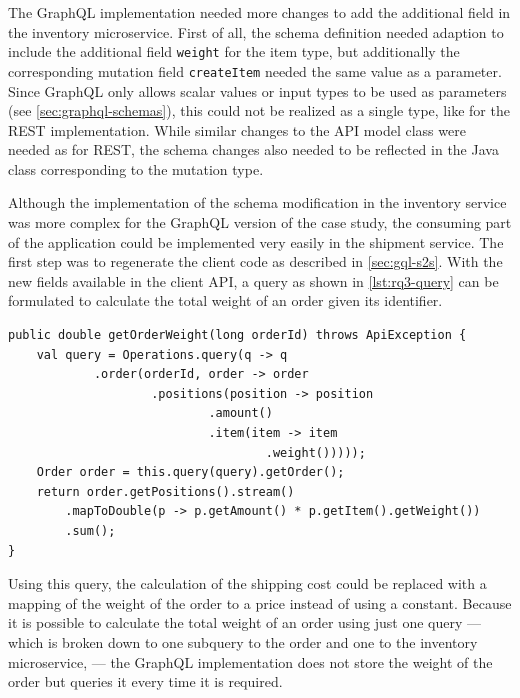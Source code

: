 The GraphQL implementation needed more changes to add the additional field in the inventory microservice.
First of all, the schema definition needed adaption to include the additional field \texttt{weight} for the item type, but additionally the corresponding mutation field \texttt{createItem} needed the same value as a parameter.
Since GraphQL only allows scalar values or input types to be used as parameters (see \autoref{sec:graphql-schemas}), this could not be realized as a single type, like for the \ac{REST} implementation.
While similar changes to the \ac{API} model class were needed as for \ac{REST}, the schema changes also needed to be reflected in the Java class corresponding to the mutation type.

Although the implementation of the schema modification in the inventory service was more complex for the GraphQL version of the case study, the consuming part of the application could be implemented very easily in the shipment service.
The first step was to regenerate the client code as described in \autoref{sec:gql-s2s}.
With the new fields available in the client \ac{API}, a query as shown in \autoref{lst:rq3-query} can be formulated to calculate the total weight of an order given its identifier.

\begin{lstlisting}[style=java-ext, caption=Querying the Total Weight of an Order using GraphQL, label=lst:rq3-query]
public double getOrderWeight(long orderId) throws ApiException {
    val query = Operations.query(q -> q
            .order(orderId, order -> order
                    .positions(position -> position
                            .amount()
                            .item(item -> item
                                    .weight()))));
    Order order = this.query(query).getOrder();
    return order.getPositions().stream()
        .mapToDouble(p -> p.getAmount() * p.getItem().getWeight())
        .sum();
}
\end{lstlisting}

Using this query, the calculation of the shipping cost could be replaced with a mapping of the weight of the order to a price instead of using a constant.
Because it is possible to calculate the total weight of an order using just one query --- which is broken down to one subquery to the order and one to the inventory microservice, --- the GraphQL implementation does not store the weight of the order but queries it every time it is required.


